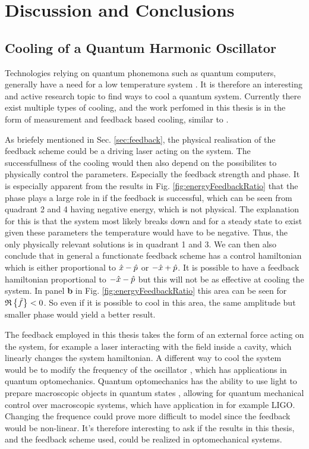 \section{Discussion and Conclusions}

\subsection{Cooling of a Quantum Harmonic Oscillator}
Technologies relying on quantum phonemona such as quantum computers, generally have a need for a low temperature system \cite{Nielsen:2010}. It is therefore an interesting and active research topic to find ways to cool a quantum system. Currently there exist multiple types of cooling, and the work perfomed in this thesis is in the form of measurement and feedback based cooling, similar to \cite{De-Sousa:2025}.

As briefely mentioned in Sec. \ref{sec:feedback}, the physical realisation of the feedback scheme could be a driving laser acting on the system. The successfullness of the cooling would then also depend on the possibilites to physically control the parameters. Especially the feedback strength and phase. It is especially apparent from the results in Fig. \ref{fig:energyFeedbackRatio} that the phase plays a large role in if the feedback is successful, which can be seen from quadrant 2 and 4 having negative energy, which is not physical. The explanation for this is that the system most likely breaks down and for a steady state to exist given these parameters the temperature would have to be negative. Thus, the only physically relevant solutions is in quadrant 1 and 3. We can then also conclude that in general a functionate feedback scheme has a control hamiltonian which is either proportional to $\hat{x} - \hat{p}$ or $-\hat{x} + \hat{p}$. It is possible to have a feedback hamiltonian proportional to $-\hat{x} - \hat{p}$ but this will not be as effective at cooling the system. In panel \textbf{b} in Fig. \ref{fig:energyFeedbackRatio} this area can be seen for $\mathfrak{R}\left\{\tilde{f}\right\} < 0$. So even if it is possible to cool in this area, the same amplitude but smaller phase would yield a better result.

The feedback employed in this thesis takes the form of an external force acting on the system, for example a laser interacting with the field inside a cavity, which linearly changes the system hamiltonian. A different way to cool the system would be to modify the frequency of the oscillator \cite{Habibi:2016}, which has applications in quantum optomechanics. Quantum optomechanics has the ability to use light to prepare macroscopic objects in quantum states \cite{Chen:2013}, allowing for quantum mechanical control over macroscopic systems, which have application in for example LIGO. Changing the frequence could prove more difficult to model since the feedback would be non-linear. It's therefore interesting to ask if the results in this thesis, and the feedback scheme used, could be realized in optomechanical systems. 

